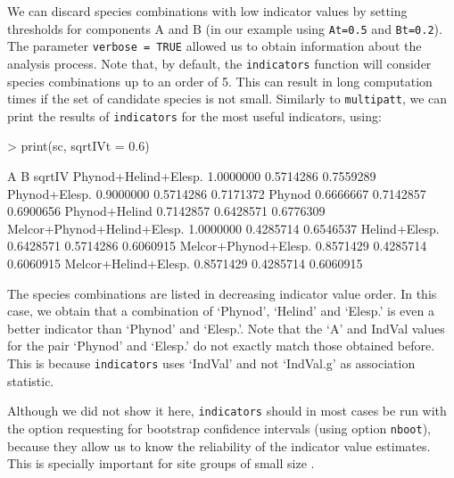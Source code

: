 \documentclass[11pt,a4paper]{article}
\begin{document}
We can discard species combinations with low indicator values by setting thresholds for components A and B (in our example using  \texttt{At=0.5} and \texttt{Bt=0.2}). The parameter \texttt{verbose = TRUE} allowed us to obtain information about the analysis process. Note that, by default, the \texttt{indicators} function will consider species combinations up to an order of 5. This can result in long computation times if the set of candidate species is not small. Similarly to \texttt{multipatt}, we can print the results of \texttt{indicators} for the most useful indicators, using:
\begin{Schunk}
\begin{Sinput}
> print(sc, sqrtIVt = 0.6)
\end{Sinput}
\begin{Soutput}
                                    A         B    sqrtIV
Phynod+Helind+Elesp.        1.0000000 0.5714286 0.7559289
Phynod+Elesp.               0.9000000 0.5714286 0.7171372
Phynod                      0.6666667 0.7142857 0.6900656
Phynod+Helind               0.7142857 0.6428571 0.6776309
Melcor+Phynod+Helind+Elesp. 1.0000000 0.4285714 0.6546537
Helind+Elesp.               0.6428571 0.5714286 0.6060915
Melcor+Phynod+Elesp.        0.8571429 0.4285714 0.6060915
Melcor+Helind+Elesp.        0.8571429 0.4285714 0.6060915
\end{Soutput}
\end{Schunk}
The species combinations are listed in decreasing indicator value order. In this case, we obtain that a combination of `Phynod', `Helind' and `Elesp.' is even a better indicator than `Phynod' and `Elesp.'. Note that the `A' and IndVal values for the pair `Phynod' and `Elesp.' do not exactly match those obtained before. This is because \texttt{indicators} uses `IndVal' and not `IndVal.g' as association statistic.

Although we did not show it here, \texttt{indicators} should in most cases be run with the option requesting for bootstrap confidence intervals (using option \texttt{nboot}), because they allow us to know the reliability of the indicator value estimates. This is specially important for site groups of small size \citep{DeCaceres2012}.
\end{document}
